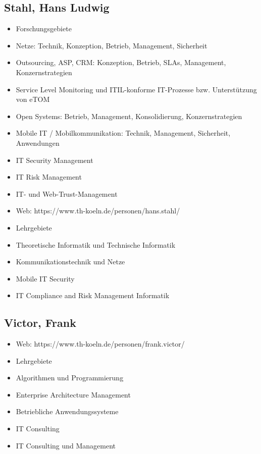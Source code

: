 \subsection{Stahl, Hans Ludwig}\label{stahl-hans-ludwig}

\begin{itemize}
\tightlist
\item
  Forschungsgebiete
\item
  Netze: Technik, Konzeption, Betrieb, Management, Sicherheit
\item
  Outsourcing, ASP, CRM: Konzeption, Betrieb, SLAs, Management,
  Konzernstrategien
\item
  Service Level Monitoring und ITIL-konforme IT-Prozesse bzw.
  Unterstützung von eTOM
\item
  Open Systems: Betrieb, Management, Konsolidierung, Konzernstrategien
\item
  Mobile IT / Mobilkommunikation: Technik, Management, Sicherheit,
  Anwendungen
\item
  IT Security Management
\item
  IT Risk Management
\item
  IT- und Web-Trust-Management
\item
  Web: https://www.th-koeln.de/personen/hans.stahl/
\item
  Lehrgebiete
\item
  Theoretische Informatik und Technische Informatik
\item
  Kommunikationstechnik und Netze
\item
  Mobile IT Security
\item
  IT Compliance and Risk Management Informatik
\end{itemize}

\subsection{Victor, Frank}\label{victor-frank}

\begin{itemize}
\item
  Web: https://www.th-koeln.de/personen/frank.victor/
\item
  Lehrgebiete
\item
  Algorithmen und Programmierung
\item
  Enterprise Architecture Management
\item
  Betriebliche Anwendungssysteme
\item
  IT Consulting~
\item
  IT Consulting und Management
\end{itemize}

